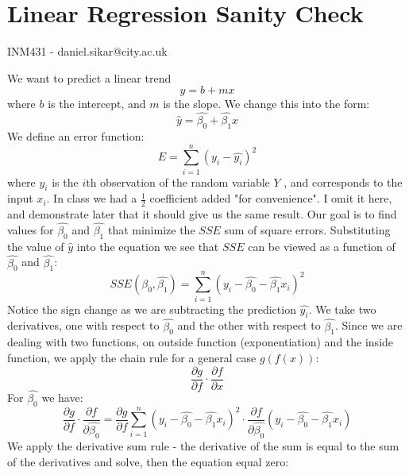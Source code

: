 \documentclass{article}
\begin{document}
\section*{Linear Regression Sanity Check}
INM431 - daniel.sikar@city.ac.uk  


We want to predict a linear trend
$$
y = b + mx
$$
where $b$ is the intercept, and $m$ is the slope. 
We change this into the form:
$$
\hat{y} = \hat{\beta_{0}} + \hat{\beta_{1}}x
$$
We define an error function:
$$ 
E = \sum_{i=1}^{n} (y_i - \hat{y_i})^2 
$$
where $y_i$ is the $i$th observation of the random variable $Y$ , and corresponds to the input $x_i$. In class we had a $\frac{1}{2}$ coefficient added "for convenience". I omit it here, and demonstrate later that it should give us the same result.
Our goal is to find values for $\hat{\beta_{0}}$ and $\hat{\beta_{1}}$ that minimize the $SSE$ sum of square errors.
Substituting the value of $\hat{y}$ into the equation we see that $SSE$ can be viewed as a function of $\hat{\beta_{0}}$ and $\hat{\beta_{1}}$:
$$
SSE(\hat{\beta_0},\hat{\beta_1}) = \sum_{i=1}^{n} (y_i - \hat{\beta_{0}} - \hat{\beta_{1}}x_i)^2 
$$
Notice the sign change as we are subtracting the prediction $\hat{y_i}$.
We take two derivatives, one with respect to $\hat{\beta_0}$ and the other with respect to $\hat{\beta_1}$. Since we are dealing with two functions, on outside function (exponentiation) and the inside function, we apply the chain rule for a general case $g(f(x))$:
$$
\frac{\partial g}{\partial f}\cdot\frac{\partial f}{\partial x}
$$
For $\hat{\beta_0}$ we have:
$$
\frac{\partial g}{\partial f}\cdot\frac{\partial f} {\partial \hat{\beta_0}} = 
\frac{\partial g}{\partial f} \sum_{i=1}^{n} (y_i - \hat{\beta_{0}} - \hat{\beta_{1}}x_i)^2 \cdot \frac{\partial f} {\partial \hat{\beta_0}} (y_i - \hat{\beta_{0}} - \hat{\beta_{1}}x_i)
$$
We apply the derivative sum rule - the derivative of the sum is equal to the sum of the derivatives and solve, then the equation equal zero:

\end{document}
